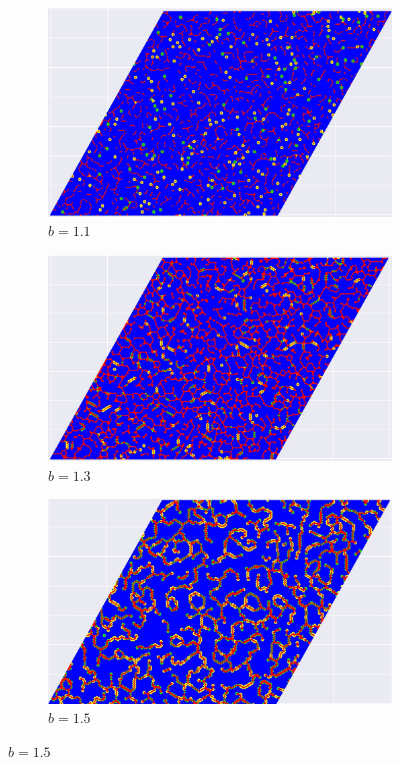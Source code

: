 \documentclass[12pt]{article}
\begin{document}
    \begin{figure}[!htbp]
        \centering
        \captionsetup{justification=centering}
        \begin{subfigure}{.33\textwidth}
          \centering
          \includegraphics[width=.9\linewidth]{TriangularMeanFieldGame/triangular_snapshot_b=11.jpg}
          \caption{$b=1.1$}
          \label{fig:trsub1}
        \end{subfigure}%
        \begin{subfigure}{.33\textwidth}
          \centering
          \includegraphics[width=.9\linewidth]{TriangularMeanFieldGame/triangular_snapshot_b=13.jpg}
          \caption{$b=1.3$}
          \label{fig:trsub2}
        \end{subfigure}%
        \begin{subfigure}{.33\textwidth}
          \centering
          \includegraphics[width=.9\linewidth]{TriangularMeanFieldGame/triangular_snapshot_b=15.jpg}
          \caption{$b=1.5$}
          \label{fig:trsub3}
        \end{subfigure}
        

\end{figure}
\end{document}
